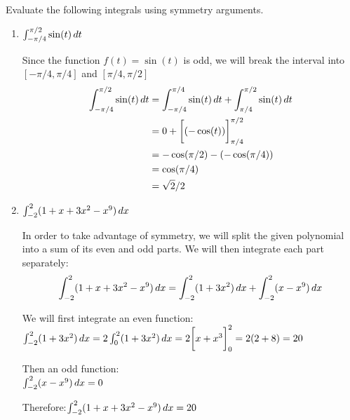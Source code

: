 \documentclass[nooutcomes]{ximera}
\begin{document}
\begin{problem}
Evaluate the following integrals using symmetry arguments.

\begin{enumerate}

   \item    $\int_{-\pi/4}^{\pi/2} \sin(t) \,d t$

      \begin{freeResponse}
        Since the function $f(t) = \sin(t)$ is odd, we will break the interval into $[-\pi/4, \pi/4]$ and $[\pi/4,\pi/2]$
        \begin{align*}
        \int_{-\pi/4}^{\pi/2} \sin(t) \,d t&= \int_{-\pi/4}^{\pi/4} \sin(t) \,d t + \int_{\pi/4}^{\pi/2} \sin(t) \,d t\\
        &=0+\bigg[ (-\cos(t)) \bigg]_{\pi/4}^{\pi/2}\\
	&=-\cos(\pi/2)-(-\cos(\pi/4))\\
	&=\cos(\pi/4)\\
	&=\sqrt{2}/2   
        \end{align*}
      \end{freeResponse}
      
      \item $\int_{-2}^2 (1+x+3x^2-x^9) \,d x$
      \begin{freeResponse}
	In order to take advantage of symmetry, we will split the given polynomial into a sum of its even and odd parts.  We will then integrate each part separately:
        $$\int_{-2}^2 (1+x+3x^2-x^9) \,d x= \int_{-2}^{2} (1+3x^2) \,d x + \int_{-2}^{2} (x-x^9) \,d x$$
        
        We will first integrate an even function:\\
$\int_{-2}^{2} (1+3x^2) \,d x =2\int_{0}^{2} (1+3x^2) \,d x=2\bigg[ x+x^3 \bigg]_0^2=2(2+8)=20$

Then an odd function:\\
$\int_{-2}^{2} (x-x^9) \,d x=0$

Therefore:$\int_{-2}^2 (1+x+3x^2-x^9) \,d x=20$
      \end{freeResponse}
      

\end{enumerate}
\end{problem}
\end{document}
